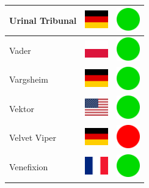 \documentclass[12pt, a4paper, twoside]{report}
\begin{document}
\begin{center}
\begin{longtable}{|p{5cm}|p{2cm}|p{2cm}|}
Urinal Tribunal & \includegraphics[width=1cm]{4x3/de} & \includegraphics[width=1cm]{likes/y} \\ \hline
Vader & \includegraphics[width=1cm]{4x3/pl} & \includegraphics[width=1cm]{likes/y} \\ \hline
Vargsheim & \includegraphics[width=1cm]{4x3/de} & \includegraphics[width=1cm]{likes/y} \\ \hline
Vektor & \includegraphics[width=1cm]{4x3/us} & \includegraphics[width=1cm]{likes/y} \\ \hline
Velvet Viper & \includegraphics[width=1cm]{4x3/de} & \includegraphics[width=1cm]{likes/n} \\ \hline
Venefixion & \includegraphics[width=1cm]{4x3/fr} & \includegraphics[width=1cm]{likes/y} \\ \hline

\end{longtable}
\end{center}
\end{document}
